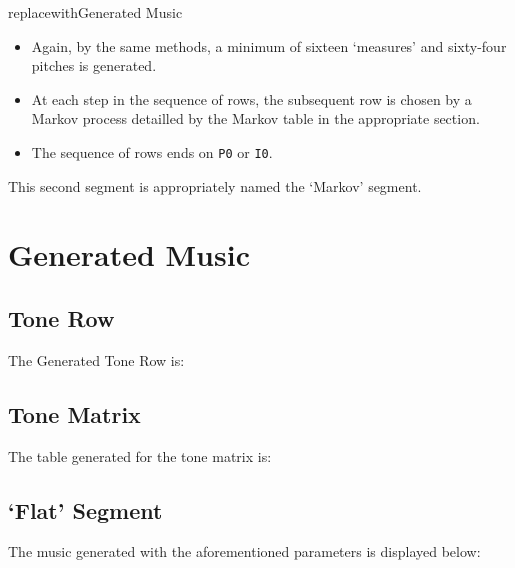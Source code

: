 \documentclass[10pt,letterpaper]{article}
\newcommand{\code}[1]{\colorbox{light-gray}{\texttt{#1}}}
\begin{document}
replacewith{Generated Music}
\begin{itemize}
  \item{Again, by the same methods, a minimum of sixteen `measures' and
    sixty-four pitches is generated. }
  \item{At each step in the sequence of rows, the subsequent row is chosen by a Markov
    process detailled by the Markov table in the appropriate section.}
  \item{The sequence of rows ends on \code{P0} or \code{I0}. }
\end{itemize}

This second segment is appropriately named the `Markov' segment.

\clearpage{}

\section*{Generated Music}

\subsection*{Tone Row}

The Generated Tone Row is:

\begin{quote}
{%
\parindent 0pt
\noindent
\ifx\preLilyPondExample \undefined
\else
  \expandafter\preLilyPondExample
\fi
%
\ifx\postLilyPondExample \undefined
\else
  \expandafter\postLilyPondExample
\fi
}
\end{quote}

\subsection*{Tone Matrix}

The table generated for the tone matrix is:



\clearpage{}

\subsection*{`Flat' Segment}
The music generated with the aforementioned parameters is displayed below:

\begin{quote}
{%
\parindent 0pt
\noindent
\ifx\preLilyPondExample \undefined
\else
  \expandafter\preLilyPondExample
\fi
%
\ifx\postLilyPondExample \undefined
\else
  \expandafter\postLilyPondExample
\fi
}
\end{quote}
\end{document}
